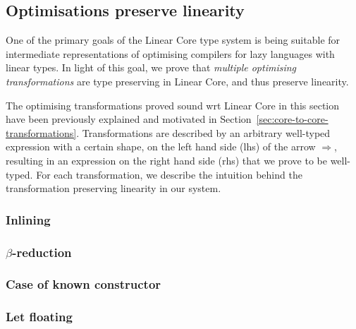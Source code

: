 \documentclass[acmsmall, screen, review]{acmart}
\begin{document}
\subsection{Optimisations preserve linearity\label{sec:optimisations-preserve-types-meta}}

One of the primary goals of the Linear Core type system is being suitable for
intermediate representations of optimising compilers for lazy languages with
linear types. In light of this goal, we prove that \emph{multiple optimising
transformations} are type preserving in Linear Core, and thus preserve linearity.

The optimising transformations proved sound wrt Linear Core in this section
have been previously explained and motivated in
Section~\ref{sec:core-to-core-transformations}.
%
Transformations are described by an arbitrary well-typed expression with a certain shape, on
the left hand side (lhs) of the arrow $\Longrightarrow$, resulting in an expression on
the right hand side (rhs) that we prove to be well-typed.
%
%
For each transformation, we describe the intuition behind the transformation
preserving linearity in our system.

\subsubsection{Inlining}




\subsubsection{\texorpdfstring{$\beta$}{Beta}-reduction}



\subsubsection{Case of known constructor}



\subsubsection{Let floating}
\end{document}
